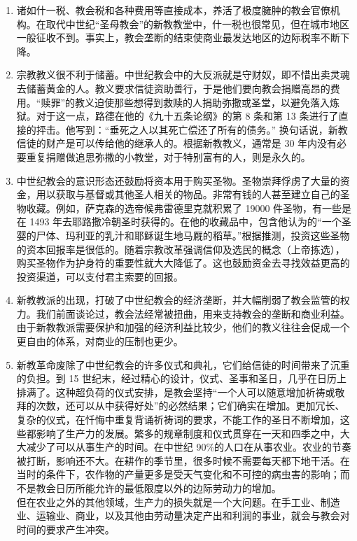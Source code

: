 \begin{enumerate}
    \item 诸如什一税、教会税和各种费用等直接成本，养活了极度臃肿的教会官僚机构。在取代中世纪“圣母教会”的新教教堂中，什一税也很常见，但在城市地区一般征收不到。事实上，教会垄断的结束使商业最发达地区的边际税率不断下降。
    \item 宗教教义很不利于储蓄。中世纪教会中的大反派就是守财奴，即不惜出卖灵魂去储蓄黄金的人。教义要求信徒资助善行，于是他们要向教会捐赠高昂的费用。“赎罪”的教义迫使那些想得到救赎的人捐助弥撒或圣堂，以避免落入炼狱。对于这一点，路德在他的《九十五条论纲》的第 8 条和第 13 条进行了直接的抨击。他写到：“垂死之人以其死亡偿还了所有的债务。” 换句话说，新教信徒的财产是可以传给他的继承人的。根据新教教义，通常是 30 年内没有必要重复捐赠做追思弥撒的小教堂，对于特别富有的人，则是永久的。
    \item 中世纪教会的意识形态还鼓励将资本用于购买圣物。圣物崇拜俘虏了大量的资金，用以获取与基督或其他圣人相关的物品。非常有钱的人甚至建立自己的圣物收藏。例如，萨克森的选帝候弗雷德里克就积累了 19000 件圣物，有一些是在 1493 年去耶路撒冷朝圣时获得的。在他的收藏品中，包含他认为的“一个圣婴的尸体、玛利亚的乳汁和耶稣诞生地马厩的稻草。”根据推测，投资这些圣物的资本回报率是很低的。随着宗教改革强调信仰及选民的概念（上帝拣选），购买圣物作为护身符的重要性就大大降低了。这也鼓励资金去寻找效益更高的投资渠道，可以支付君主索要的回报。
    \item 新教教派的出现，打破了中世纪教会的经济垄断，并大幅削弱了教会监管的权力。我们前面谈论过，教会法经常被扭曲，用来支持教会的垄断和商业利益。由于新教教派需要保护和加强的经济利益比较少，他们的教义往往会促成一个更自由的体系，对商业的压制也更少。
    \item 新教革命废除了中世纪教会的许多仪式和典礼，它们给信徒的时间带来了沉重的负担。到 15 世纪末，经过精心的设计，仪式、圣事和圣日，几乎在日历上排满了。这种超负荷的仪式安排，是教会坚持“一个人可以随意增加祈祷或敬拜的次数，还可以从中获得好处”的必然结果；它们确实在增加。更加冗长、复杂的仪式，在忏悔中重复背诵祈祷词的要求，不能工作的圣日不断增加，这些都影响了生产力的发展。繁多的规章制度和仪式贯穿在一天和四季之中，大大减少了可以从事生产的时间。在中世纪 90\%的人口在从事农业。农业的节奏被打断，影响还不大。在耕作的季节里，很多时候不需要每天都下地干活。在当时的条件下，农作物的产量更多是受天气变化和不可控的病虫害的影响；而不是教会日历所能允许的最低限度以外的边际劳动力的增加。\\
    
    但在农业之外的其他领域，生产力的损失就是一个大问题。在手工业、制造业、运输业、商业，以及其他由劳动量决定产出和利润的事业，就会与教会对时间的要求产生冲突。\\ 
    

\end{enumerate}
